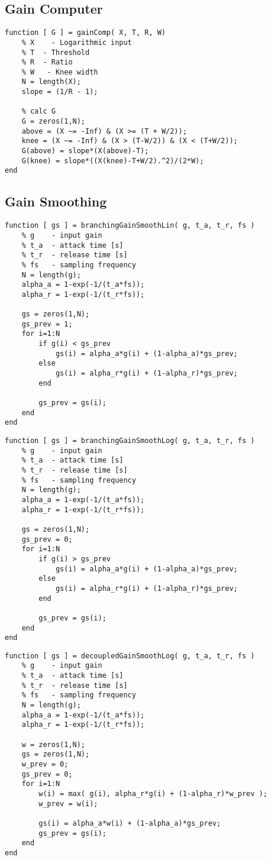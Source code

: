 \documentclass[../main2.tex]{subfiles}
\begin{document}
\subsection{Gain Computer}
\begin{lstlisting}[style=customc]
function [ G ] = gainComp( X, T, R, W)
    % X    - Logarithmic input 
    % T  - Threshold
    % R  - Ratio
    % W   - Knee width
    N = length(X);
    slope = (1/R - 1);
    
    % calc G
    G = zeros(1,N);
    above = (X ~= -Inf) & (X >= (T + W/2));
    knee = (X ~= -Inf) & (X > (T-W/2)) & (X < (T+W/2));
    G(above) = slope*(X(above)-T);
    G(knee) = slope*((X(knee)-T+W/2).^2)/(2*W);
end
\end{lstlisting}
\subsection{Gain Smoothing}
\begin{lstlisting}[style=customc]
function [ gs ] = branchingGainSmoothLin( g, t_a, t_r, fs )
    % g    - input gain
    % t_a  - attack time [s]
    % t_r  - release time [s]
    % fs   - sampling frequency 
    N = length(g);
    alpha_a = 1-exp(-1/(t_a*fs));
    alpha_r = 1-exp(-1/(t_r*fs));
    
    gs = zeros(1,N);
    gs_prev = 1;
    for i=1:N
        if g(i) < gs_prev
            gs(i) = alpha_a*g(i) + (1-alpha_a)*gs_prev;
        else
            gs(i) = alpha_r*g(i) + (1-alpha_r)*gs_prev;
        end
        
        gs_prev = gs(i);
    end
end
\end{lstlisting}
\begin{lstlisting}[style=customc]
function [ gs ] = branchingGainSmoothLog( g, t_a, t_r, fs )
    % g    - input gain
    % t_a  - attack time [s]
    % t_r  - release time [s]
    % fs   - sampling frequency 
    N = length(g);
    alpha_a = 1-exp(-1/(t_a*fs));
    alpha_r = 1-exp(-1/(t_r*fs));
    
    gs = zeros(1,N);
    gs_prev = 0;
    for i=1:N
        if g(i) > gs_prev
            gs(i) = alpha_a*g(i) + (1-alpha_a)*gs_prev;
        else
            gs(i) = alpha_r*g(i) + (1-alpha_r)*gs_prev;
        end
        
        gs_prev = gs(i);
    end
end
\end{lstlisting}
\begin{lstlisting}[style=customc]
function [ gs ] = decoupledGainSmoothLog( g, t_a, t_r, fs )
    % g    - input gain
    % t_a  - attack time [s]
    % t_r  - release time [s]
    % fs   - sampling frequency 
    N = length(g);
    alpha_a = 1-exp(-1/(t_a*fs));
    alpha_r = 1-exp(-1/(t_r*fs));
    
    w = zeros(1,N);
    gs = zeros(1,N);
    w_prev = 0;
    gs_prev = 0;
    for i=1:N
        w(i) = max( g(i), alpha_r*g(i) + (1-alpha_r)*w_prev );
        w_prev = w(i);
        
        gs(i) = alpha_a*w(i) + (1-alpha_a)*gs_prev;
        gs_prev = gs(i);
    end
end
\end{lstlisting}
\end{document}
